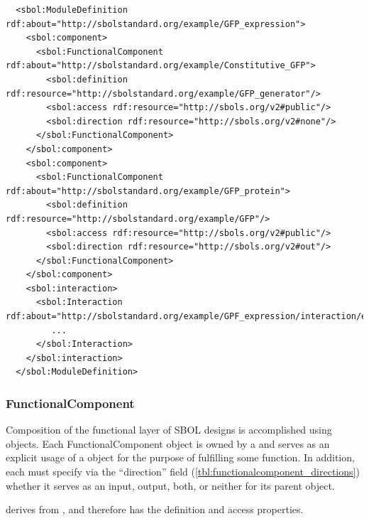 \begin{lstlisting}
  <sbol:ModuleDefinition rdf:about="http://sbolstandard.org/example/GFP_expression">
    <sbol:component>
      <sbol:FunctionalComponent rdf:about="http://sbolstandard.org/example/Constitutive_GFP">
        <sbol:definition rdf:resource="http://sbolstandard.org/example/GFP_generator"/>
        <sbol:access rdf:resource="http://sbols.org/v2#public"/>
        <sbol:direction rdf:resource="http://sbols.org/v2#none"/>
      </sbol:FunctionalComponent>
    </sbol:component>
    <sbol:component>
      <sbol:FunctionalComponent rdf:about="http://sbolstandard.org/example/GFP_protein">
        <sbol:definition rdf:resource="http://sbolstandard.org/example/GFP"/>
        <sbol:access rdf:resource="http://sbols.org/v2#public"/>
        <sbol:direction rdf:resource="http://sbols.org/v2#out"/>
      </sbol:FunctionalComponent>
    </sbol:component>
    <sbol:interaction>
      <sbol:Interaction rdf:about="http://sbolstandard.org/example/GPF_expression/interaction/express_GFP">
         ...
      </sbol:Interaction>
    </sbol:interaction>
  </sbol:ModuleDefinition>
\end{lstlisting}


\subsubsection{FunctionalComponent}
\label{sec:FunctionalComponent}
Composition of the functional layer of SBOL designs is accomplished using  objects. Each FunctionalComponent object is owned by a  and serves as an explicit usage of a  object for the purpose of fulfilling some function. In addition, each  must specify via the ``direction'' field (\ref{tbl:functionalcomponent_directions}) whether it serves as an  input, output, both, or neither for its parent  object. 


 derives from , and therefore has the definition and access properties. 


